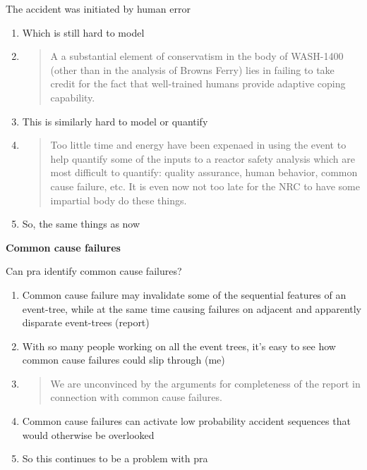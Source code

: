 \documentclass[aspectratio=1610,pdftex,dvipsnames,compress,xcolor={dvipsnames}]{beamer}
\newcommand{\acs}{\acrshort} %
\begin{document}
\begin{frame}{The accident was initiated by human error}
    \begin{enumerate}[series=outerlist,topsep=0pt,itemsep=15pt,leftmargin=*,label=(\arabic*)]
        \item[]Which is still hard to model
        \item[]
            \begin{quote}
                A a substantial element of conservatism in the body of WASH-1400 (other than in the analysis of Browns Ferry) lies in failing to take credit for the fact that well-trained humans provide adaptive coping capability.
            \end{quote}
        \item[]This is similarly hard to model or quantify
        \item[]
            \begin{quote}
                Too little time and energy have been expenaed in using the event to help quantify some of the inputs to a reactor safety analysis which are most difficult to quantify: quality assurance, human behavior, common cause failure, etc. It is even now not too late for the NRC to have some impartial body do these things.
            \end{quote}
        \item[]So, the same things as now 
    \end{enumerate}
\end{frame}


\begin{frame}[plain]{}
    \centering\LARGE\textbf{Common cause failures}
\end{frame}


\addtocounter{framenumber}{-1}
\begin{frame}{Can \acs{pra} identify common cause failures?}
    \begin{enumerate}[series=outerlist,topsep=0pt,itemsep=21pt,leftmargin=*,label=(\arabic*)]
        \item[]Common cause failure may invalidate some of the sequential features of an event-tree, while at the same time causing failures on adjacent and apparently disparate event-trees (report)
        \item[]With so many people working on all the event trees, it's easy to see how common cause failures could slip through (me) 
        \item[]
            \begin{quote}
                We are unconvinced by the arguments for completeness of the report in connection with common cause failures.
            \end{quote}
        \item[]Common cause failures can activate low probability accident sequences that would otherwise be overlooked
        \item[]So this continues to be a problem with \acs{pra}
    \end{enumerate}
\end{frame}
\end{document}

